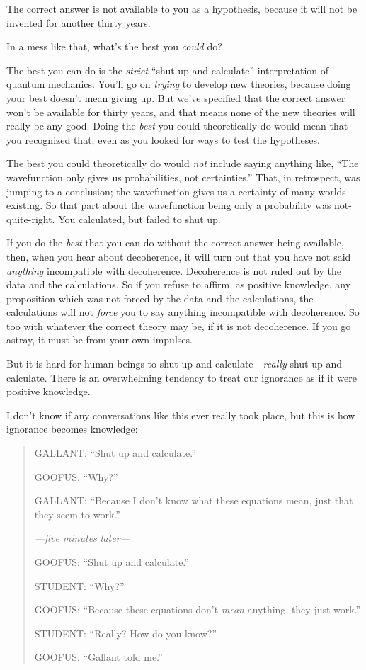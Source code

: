 {
 The correct answer is not available to you as a hypothesis,
because it will not be invented for another thirty years.}

{
 In a mess like that, what's the best you
\textit{could} do?}

{
 The best you can do is the \textit{strict} ``shut
up and calculate'' interpretation of quantum
mechanics. You'll go on \textit{trying} to develop new
theories, because doing your best doesn't mean giving
up. But we've specified that the correct answer
won't be available for thirty years, and that means
none of the new theories will really be any good. Doing the
\textit{best} you could theoretically do would mean that you recognized
that, even as you looked for ways to test the hypotheses.}

{
 The best you could theoretically do would \textit{not} include
saying anything like, ``The wavefunction only gives us
probabilities, not certainties.'' That, in
retrospect, was jumping to a conclusion; the wavefunction gives us a
certainty of many worlds existing. So that part about the wavefunction
being only a probability was not-quite-right. You calculated, but
failed to shut up.}

{
 If you do the \textit{best} that you can do without the correct
answer being available, then, when you hear about decoherence, it will
turn out that you have not said \textit{anything} incompatible with
decoherence. Decoherence is not ruled out by the data and the
calculations. So if you refuse to affirm, as positive knowledge, any
proposition which was not forced by the data and the calculations, the
calculations will not \textit{force} you to say anything incompatible
with decoherence. So too with whatever the correct theory may be, if it
is not decoherence. If you go astray, it must be from your own
impulses.}

{
 But it is hard for human beings to shut up and
calculate---\textit{really} shut up and calculate. There is an
overwhelming tendency to treat our ignorance as if it were positive
knowledge.}

{
 I don't know if any conversations like this ever
really took place, but this is how ignorance becomes knowledge:}

\begin{quotation}
{
 GALLANT: ``Shut up and
calculate.''}

{
 GOOFUS: ``Why?''}

{
 GALLANT: ``Because I don't know
what these equations mean, just that they seem to
work.''}

{
 \textit{{}---five minutes later---}}

{
 GOOFUS: ``Shut up and
calculate.''}

{
 STUDENT: ``Why?''}

{
 GOOFUS: ``Because these equations
don't \textit{mean} anything, they just
work.''}

{
 STUDENT: ``Really? How do you
know?''}

{
  GOOFUS: ``Gallant told me.''}
\end{quotation}

